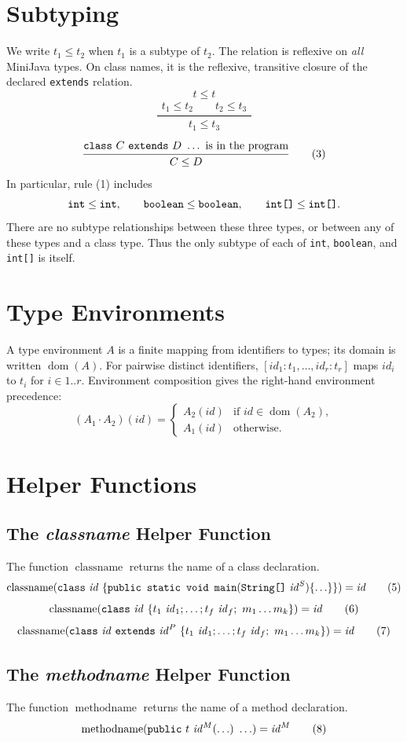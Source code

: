 \documentclass[11pt,a4paper]{article}
\newcommand{\kw}[1]{\text{\texttt{#1}}}
\newcommand{\mn}{\operatorname{methodname}}
\newcommand{\cn}{\operatorname{classname}}
\newcommand{\id}{\mathit{id}}
\newcommand{\ruleeq}[3]{\begin{equation}\frac{\begin{gathered}#2\end{gathered}}{\begin{gathered}#3\end{gathered}}\tag{#1}\end{equation}}
\newcommand{\axiom}[2]{\begin{equation}#2\tag{#1}\end{equation}}
\begin{document}
\section{Subtyping}
We write $t_1\leq t_2$ when $t_1$ is a subtype of $t_2$. The relation is reflexive
on \emph{all} MiniJava types. On class names, it is the reflexive, transitive
closure of the declared \texttt{extends} relation.
\axiom{1}{t\leq t}
\ruleeq{2}{t_1\leq t_2\qquad t_2\leq t_3}{t_1\leq t_3}
\ruleeq{3}{\kw{class}\ C\ \kw{extends}\ D\ \ldots\ \text{is in the program}}{C\leq D}
In particular, rule (1) includes
\[
\kw{int}\leq\kw{int},\qquad
\kw{boolean}\leq\kw{boolean},\qquad
\kw{int[]}\leq\kw{int[]}.
\]
There are no subtype relationships between these three types, or between any of
these types and a class type. Thus the only subtype of each of \texttt{int},
\texttt{boolean}, and \texttt{int[]} is itself.

\section{Type Environments}
A type environment $A$ is a finite mapping from identifiers to types; its domain
is written $\operatorname{dom}(A)$. For pairwise distinct identifiers,
$[\id_1:t_1,\ldots,\id_r:t_r]$ maps $\id_i$ to $t_i$ for $i\in1..r$.
Environment composition gives the right-hand environment precedence:
\axiom{4}{(A_1\cdot A_2)(\id)=
\begin{cases}A_2(\id)&\text{if }\id\in\operatorname{dom}(A_2),\\
A_1(\id)&\text{otherwise.}\end{cases}}

\newpage
\section{Helper Functions}
\subsection{The \textit{classname} Helper Function}
The function $\cn$ returns the name of a class declaration.
\axiom{5}{\cn(\kw{class}\ \id\ \{\kw{public\ static\ void\ main}(\kw{String[]}\ \id^S)\{\ldots\}\})=\id}
\axiom{6}{\cn(\kw{class}\ \id\ \{t_1\ \id_1;\ldots;t_f\ \id_f;\ m_1\ldots m_k\})=\id}
\axiom{7}{\cn(\kw{class}\ \id\ \kw{extends}\ \id^P\ \{t_1\ \id_1;\ldots;t_f\ \id_f;\ m_1\ldots m_k\})=\id}
\subsection{The \textit{methodname} Helper Function}
The function $\mn$ returns the name of a method declaration.
\axiom{8}{\mn(\kw{public}\ t\ \id^M(\ldots)\ \ldots)=\id^M}
\end{document}

